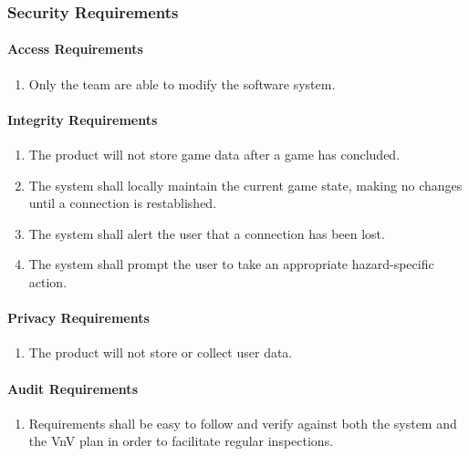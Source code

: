 \documentclass[12pt]{article}
\begin{document}
\subsubsection{Security Requirements}
\label{NFR_SR}
\paragraph{Access Requirements}
\begin{enumerate}[{SR}1., leftmargin=2\parindent]
    \item Only the \progname{} team are able to modify the software system.
\end{enumerate}

\paragraph{Integrity Requirements}
\begin{enumerate}[{SR}1., leftmargin=2\parindent, resume]
    \item The product will not store game data after a game has concluded.
    \item The system shall locally maintain the current game state, making no changes until a connection is restablished.
    \item The system shall alert the user that a connection has been lost.
    \item The system shall prompt the user to take an appropriate hazard-specific action.
\end{enumerate}

\paragraph{Privacy Requirements}
\begin{enumerate}[{SR}1., leftmargin=2\parindent, resume]
    \item The product will not store or collect user data.
\end{enumerate}

\paragraph{Audit Requirements}
\begin{enumerate}[{SR}1., leftmargin=2\parindent, resume]
    \item Requirements shall be easy to follow and verify against both the system and the VnV plan in order to facilitate regular inspections.
\end{enumerate}
\end{document}
